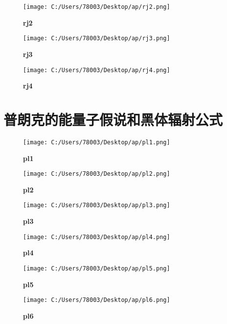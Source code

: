 \documentclass[UTF8]{report}
\theoremstyle{MyLineTheoremStyle} %
\theoremstyle{MyBlockTheoremStyle} %
\theoremstyle{MySubsubsectionStyle} %
\begin{document}
\begin{figure}[ht]
    \centering
    \texttt{[image: C:/Users/78003/Desktop/ap/rj2.png]}
    \caption{\textbf{rj2}}
    \label{fig:rj2}
\end{figure}

\begin{figure}[ht]
    \centering
    \texttt{[image: C:/Users/78003/Desktop/ap/rj3.png]}
    \caption{\textbf{rj3}}
    \label{fig:rj3}
\end{figure}

\begin{figure}[ht]
    \centering
    \texttt{[image: C:/Users/78003/Desktop/ap/rj4.png]}
    \caption{\textbf{rj4}}
    \label{fig:rj4}
\end{figure}

\cleardoublepage
\section{普朗克的能量子假说和黑体辐射公式}

\begin{figure}[ht]
    \centering
    \texttt{[image: C:/Users/78003/Desktop/ap/pl1.png]}
    \caption{\textbf{pl1}}
    \label{fig:pl1}
\end{figure}

\begin{figure}[ht]
    \centering
    \texttt{[image: C:/Users/78003/Desktop/ap/pl2.png]}
    \caption{\textbf{pl2}}
    \label{fig:pl2}
\end{figure}

\begin{figure}[ht]
    \centering
    \texttt{[image: C:/Users/78003/Desktop/ap/pl3.png]}
    \caption{\textbf{pl3}}
    \label{fig:pl3}
\end{figure}

\begin{figure}[ht]
    \centering
    \texttt{[image: C:/Users/78003/Desktop/ap/pl4.png]}
    \caption{\textbf{pl4}}
    \label{fig:pl4}
\end{figure}

\begin{figure}[ht]
    \centering
    \texttt{[image: C:/Users/78003/Desktop/ap/pl5.png]}
    \caption{\textbf{pl5}}
    \label{fig:pl5}
\end{figure}

\begin{figure}[ht]
    \centering
    \texttt{[image: C:/Users/78003/Desktop/ap/pl6.png]}
    \caption{\textbf{pl6}}
    \label{fig:pl6}
\end{figure}
\end{document}
